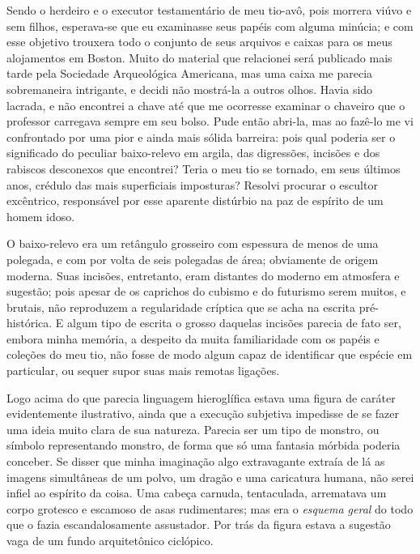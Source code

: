 \begin{pages}
\begin{Rightside}
Sendo o herdeiro e o executor testamentário de meu tio-avô, pois morrera
viúvo e sem filhos, esperava-se que eu examinasse seus papéis com alguma
minúcia; e com esse objetivo trouxera todo o conjunto de seus arquivos e
caixas para os meus alojamentos em Boston. Muito do material que
relacionei será publicado mais tarde pela Sociedade Arqueológica
Americana, mas uma caixa me parecia sobremaneira intrigante, e decidi
não mostrá-la a outros olhos. Havia sido lacrada, e não encontrei a
chave até que me ocorresse examinar o chaveiro que o professor carregava
sempre em seu bolso. Pude então abri-la, mas ao fazê-lo me vi
confrontado por uma pior e ainda mais sólida barreira: pois qual poderia
ser o significado do peculiar baixo-relevo em argila, das digressões,
incisões e dos rabiscos desconexos que encontrei? Teria o meu tio se
tornado, em seus últimos anos, crédulo das mais superficiais imposturas?
Resolvi procurar o escultor excêntrico, responsável por esse aparente
distúrbio na paz de espírito de um homem idoso.

O baixo-relevo era um retângulo grosseiro com espessura de menos de uma
polegada, e com por volta de seis polegadas de área; obviamente de
origem moderna. Suas incisões, entretanto, eram distantes do moderno em
atmosfera e sugestão; pois apesar de os caprichos do cubismo e do
futurismo serem muitos, e brutais, não reproduzem a regularidade
críptica que se acha na escrita pré-histórica. E algum tipo de escrita o
grosso daquelas incisões parecia de fato ser, embora minha memória, a
despeito da muita familiaridade com os papéis e coleções do meu tio, não
fosse de modo algum capaz de identificar que espécie em particular, ou
sequer supor suas mais remotas ligações.

Logo acima do que parecia linguagem hieroglífica estava uma figura de
caráter evidentemente ilustrativo, ainda que a execução subjetiva
impedisse de se fazer uma ideia muito clara de sua natureza. Parecia ser
um tipo de monstro, ou símbolo representando monstro, de forma que só
uma fantasia mórbida poderia conceber. Se disser que minha imaginação
algo extravagante extraía de lá as imagens simultâneas de um polvo, um
dragão e uma caricatura humana, não serei infiel ao espírito da coisa.
Uma cabeça carnuda, tentaculada, arrematava um corpo grotesco e escamoso
de asas rudimentares; mas era o \emph{esquema geral} do todo que o fazia
escandalosamente assustador. Por trás da figura estava a sugestão vaga
de um fundo arquitetônico ciclópico.


\end{Rightside}
\end{pages}
